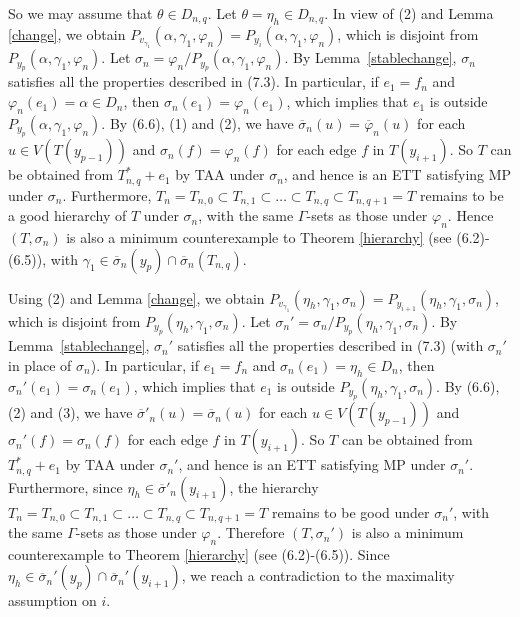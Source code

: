 \documentclass[11pt]{article}
\newcommand{\phibar}{\overline{\varphi}}
\begin{document}
So we may assume that $\theta\in D_{n,q}$. Let $\theta=\eta_h\in D_{n,q}$. In view of (2) and Lemma \ref{change}, we obtain $P_{v_{\gamma_1}}(\alpha,\gamma_{1},\varphi_n)=P_{y_{i}}(\alpha,\gamma_{1},\varphi_n)$, which is disjoint from $P_{y_{p}}(\alpha,\gamma_{1},\varphi_n)$.  Let $\sigma_n=\varphi_n/P_{y_{p}}(\alpha,\gamma_{1},\varphi_n)$. 
By Lemma~\ref{stablechange}, $\sigma_n$ satisfies all the properties described in (7.3). In particular,
if $e_1=f_n$ and $\varphi_n(e_1)=\alpha \in D_n$, then $\sigma_n(e_1)=\varphi_n(e_1)$, which implies that $e_1$ is outside 
$P_{y_{p}}(\alpha,\gamma_{1},\varphi_n)$. By (6.6), (1) and (2), we have $\overline{\sigma}_n(u)=\phibar_n(u)$ for each 
$u \in V(T(y_{p-1}))$ and $\sigma_n(f)=\varphi_n(f)$ for each edge $f$ in $T(y_{i+1})$. So $T$ can be obtained from 
$T_{n,q}^*+e_1$ by TAA under $\sigma_n$, and hence is an ETT satisfying MP under $\sigma_n$. Furthermore, $T_n=T_{n,0} \subset T_{n,1} 
\subset \ldots \subset T_{n,q}\subset T_{n,q+1}=T$ remains to be a good hierarchy of $T$ under $\sigma_n$, with the same 
$\Gamma$-sets as those under $\varphi_n$. Hence $(T, \sigma_n)$ is also a minimum counterexample to Theorem \ref{hierarchy} 
(see (6.2)-(6.5)), with $\gamma_{1}\in \overline{\sigma}_n(y_p) \cap \overline{\sigma}_n(T_{n,q})$.

Using (2) and Lemma \ref{change}, we obtain $P_{v_{\gamma_{1}}}(\eta_h, \gamma_{1},\sigma_n) =P_{y_{i+1}}(\eta_h,\gamma_{1}, \sigma_n)$, which is disjoint from $P_{y_{p}}(\eta_h, \gamma_{1},\sigma_n)$. Let $\sigma_n'=\sigma_n/P_{y_{p}}(\eta_h,\gamma_{1},\sigma_n)$.  By Lemma~\ref{stablechange}, $\sigma_n'$ satisfies all the 
properties described in (7.3) (with $\sigma_n'$ in place of $\sigma_n$). In particular, if $e_1=f_n$ and $\sigma_n(e_1)
=\eta_h \in D_n$, then $\sigma_n'(e_1)=\sigma_n(e_1)$, which implies that $e_1$ is outside $P_{y_{p}}(\eta_h,\gamma_{1},\sigma_n)$. 
By (6.6), (2) and (3), we have $\overline{\sigma}'_n(u)=\overline{\sigma}_n(u)$ for each $u \in V(T(y_{p-1}))$ and $\sigma_n'(f)=\sigma_n(f)$ for each edge $f$ in $T(y_{i+1})$.  So $T$ can be obtained from $T_{n,q}^*+e_1$ by TAA under 
$\sigma_n'$, and hence is an ETT satisfying MP under $\sigma_n'$. Furthermore, since $\eta_h \in \overline{\sigma}'_n(y_{i+1})$,
the hierarchy $T_n=T_{n,0} \subset T_{n,1} \subset \ldots \subset T_{n,q}\subset T_{n,q+1}=T$ remains 
to be good under $\sigma_n'$, with the same $\Gamma$-sets as those under $\varphi_n$. Therefore 
$(T, \sigma_n')$ is also a minimum counterexample to Theorem \ref{hierarchy} (see (6.2)-(6.5)). Since $\eta_h \in\overline{\sigma}_n'(y_p)\cap\overline{\sigma}_n'(y_{i+1})$, we reach a contradiction to the maximality assumption on $i$.
\end{document}
